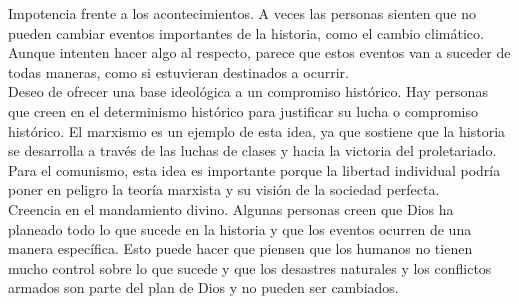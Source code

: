 \documentclass[10pt, a4paper]{article}
\begin{document}
\begin{enumerate}
\begin{enumerate}
          Impotencia frente a los acontecimientos. A veces las personas sienten 
          que no pueden cambiar eventos importantes de la historia, como el cambio 
          climático. Aunque intenten hacer algo al respecto, parece que estos eventos 
          van a suceder de todas maneras, como si estuvieran destinados a ocurrir.\\ 

          Deseo de ofrecer una base ideológica a un compromiso histórico. Hay personas 
          que creen en el determinismo histórico para justificar su lucha o 
          compromiso histórico. El marxismo es un ejemplo de esta idea, ya que 
          sostiene que la historia se desarrolla a través de las luchas de clases 
          y hacia la victoria del proletariado. Para el comunismo, esta idea es 
          importante porque la libertad individual podría poner en peligro la 
          teoría marxista y su visión de la sociedad perfecta.\\
          
          Creencia en el mandamiento divino. Algunas personas creen que Dios 
          ha planeado todo lo que sucede en la historia y que los eventos ocurren 
          de una manera específica. Esto puede hacer que piensen que los humanos 
          no tienen mucho control sobre lo que sucede y que los desastres naturales 
          y los conflictos armados son parte del plan de Dios y no pueden ser cambiados. 
      \end{enumerate}
        
    \end{enumerate}
    
\end{document}
